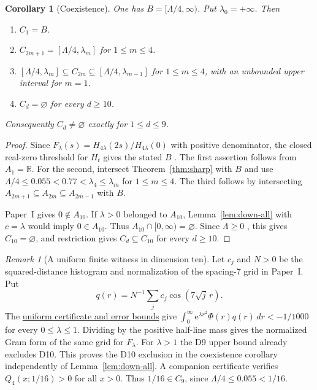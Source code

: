 \documentclass[11pt]{article}
\newtheorem{corollary}[theorem]{Corollary}
\theoremstyle{remark}
\newtheorem{remark}[theorem]{Remark}
\newcommand{\R}{\mathbb{R}}
\newcommand{\ee}{\mathrm{e}}
\begin{document}
\begin{corollary}[Coexistence]\label{thm:coexist}
One has $B=[\Lambda/4,\infty)$. Put $\lambda_0=+\infty$. Then
\begin{enumerate}
\item $C_1=B$.
\item $C_{2m+1}=[\Lambda/4,\lambda_m]$ for $1\le m\le4$.
\item $[\Lambda/4,\lambda_m]\subseteq C_{2m}\subseteq[\Lambda/4,\lambda_{m-1}]$
for $1\le m\le4$, with an unbounded upper interval for $m=1$.
\item $C_d=\varnothing$ for every $d\ge10$.
\end{enumerate}
Consequently $C_d\ne\varnothing$ exactly for $1\le d\le9$.
\end{corollary}
\begin{proof}
Since $F_\lambda(s)=H_{4\lambda}(2s)/H_{4\lambda}(0)$ with positive
denominator, the closed real-zero threshold for $H_t$ gives the stated
$B$ \cite{RT,Polymath}. The first assertion follows from $A_1=\R$.
For the second, intersect Theorem~\ref{thm:sharp} with $B$ and use
$\Lambda/4\le0.055<0.77<\lambda_4\le\lambda_m$ for $1\le m\le4$.
The third follows by intersecting
$A_{2m+1}\subseteq A_{2m}\subseteq A_{2m-1}$ with $B$.

Paper~I \cite{PaperI} gives $0\notin A_{10}$. If $\lambda>0$ belonged
to $A_{10}$, Lemma~\ref{lem:down-all} with $c=\lambda$ would imply
$0\in A_{10}$. Thus $A_{10}\cap[0,\infty)=\varnothing$. Since
$\Lambda\ge0$ \cite{RT}, this gives $C_{10}=\varnothing$, and restriction
gives $C_d\subseteq C_{10}$ for every $d\ge10$.
\end{proof}

\begin{remark}[A uniform finite witness in dimension ten]
Let $c_j$ and $N>0$ be the squared-distance histogram and normalization of
the spacing-$7$ grid in Paper~I. Put
\[
 q(r)=N^{-1}\sum_j c_j\cos(7\sqrt j\,r).
\]
The \href{https://github.com/iqwalker-debug/xi-positive-definiteness-/blob/4e53689a04e144a8aabd716e19852d295be38157/paper-ii/D10-heat-witness.md}{uniform certificate and error bounds}
give $\int_0^\infty \ee^{\lambda r^2}\Phi(r)q(r)\,dr<-1/1000$
for every $0\le\lambda\le1$. Dividing by the positive half-line mass gives
the normalized Gram form of the same grid for $F_\lambda$. For $\lambda>1$
the D9 upper bound already excludes D10. This proves the D10 exclusion
in the coexistence corollary independently of Lemma~\ref{lem:down-all}.
A companion certificate verifies $Q_4(x;1/16)>0$ for all $x>0$.
Thus $1/16\in C_9$, since $\Lambda/4\le0.055<1/16$.
\end{remark}
\end{document}
